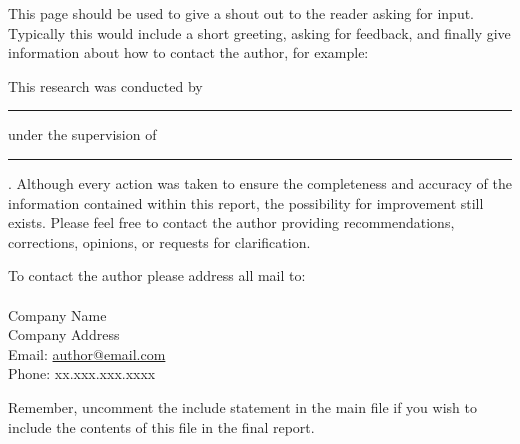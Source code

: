 \begin{feedbackrqst}
	This page should be used to give a shout out to the reader asking for input. Typically this would include a short greeting, asking for feedback, and finally give information about how to contact the author, for example:
	
	This research was conducted by  \rule{2in}{.1pt} under the supervision of\\ \rule{2in}{.1pt}. Although every action was taken to ensure the completeness and accuracy of the information contained within this report, the possibility for improvement still exists. Please feel free to contact the author providing recommendations, corrections, opinions, or requests for clarification.
	
	To contact the author please address all mail to:\\
	\reportauthora\\
	Company Name\\
	Company Address\\
	
	Email: \href{mailto:author@email.com}{author@email.com}\\
	Phone: xx.xxx.xxx.xxxx
	
	Remember, uncomment the include statement in the main file if you wish to include the contents of this file in the final report.
\end{feedbackrqst}